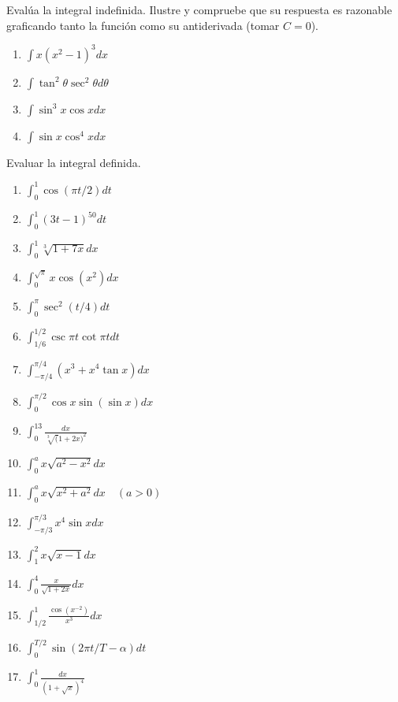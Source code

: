 \documentclass[12pt,]{article}
\begin{document}
Evalúa la integral indefinida. Ilustre y compruebe que su respuesta es
razonable graficando tanto la función como su antiderivada (tomar
\(C=0\)).

\begin{enumerate}
\def\labelenumi{\arabic{enumi}.}
\setcounter{enumi}{30}
\item
  \(\displaystyle\int x (x^2-1)^3dx\)
\item
  \(\displaystyle\int\tan^2 \theta \sec^2 \theta d\theta\)
\item
  \(\displaystyle\int\sin^3 x \cos x dx\)
\item
  \(\displaystyle\int\sin x \cos^4 x dx\)
\end{enumerate}

Evaluar la integral definida.

\begin{enumerate}
\def\labelenumi{\arabic{enumi}.}
\setcounter{enumi}{34}
\item
  \(\displaystyle\int_{0}^{1}\cos(\pi t/2)dt\)
\item
  \(\displaystyle\int_{0}^{1}(3t-1)^{50}dt\)
\item
  \(\displaystyle\int_{0}^{1}\sqrt[3]{1+7x}dx\)
\item
  \(\displaystyle\int_{0}^{\sqrt{\pi}}x \cos(x^2)dx\)
\item
  \(\displaystyle\int_{0}^{\pi}\sec^2(t/4)dt\)
\item
  \(\displaystyle\int_{1/6}^{1/2}\csc\pi t\cot \pi t dt\)
\item
  \(\displaystyle\int_{-\pi/4}^{\pi/4}(x^3+x^4\tan x)dx\)
\item
  \(\displaystyle\int_{0}^{\pi/2}\cos x \sin(\sin x)dx\)
\item
  \(\displaystyle\int_{0}^{13}\frac{dx}{\sqrt[3](1+2x)^2}\)
\item
  \(\displaystyle\int_{0}^{a}x\sqrt{a^2-x^2}dx\)
\item
  \(\displaystyle\int_{0}^{a}x\sqrt{x^2+a^2}dx\quad (a>0)\)
\item
  \(\displaystyle\int_{-\pi/3}^{\pi/3}x^4\sin x dx\)
\item
  \(\displaystyle\int_{1}^{2}x\sqrt{x-1}dx\)
\item
  \(\displaystyle\int_{0}^{4}\frac{x}{\sqrt{1+2x}}dx\)
\item
  \(\displaystyle\int_{1/2}^{1}\frac{\cos(x^{-2})}{x^3}dx\)
\item
  \(\displaystyle\int_{0}^{T/2}\sin(2\pi t/T-\alpha)dt\)
\item
  \(\displaystyle\int_{0}^{1}\frac{dx}{(1+\sqrt{x})^4}\)
\end{enumerate}
\end{document}
